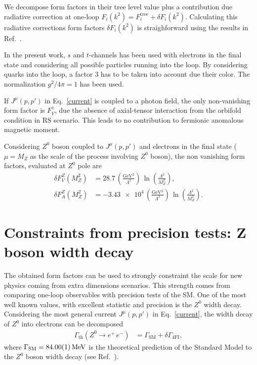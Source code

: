 \documentclass[twocolumn,showpacs,showkeys,prd,superscriptaddress]{revtex4-1}
\begin{document}
We decompose form factors in their tree level value plus a contribution due radiative correction at one-loop $F_i(k^2) = F_i^{\text{tree}} + \delta F_i(k^2)$. Calculating this radiative corrections form factors $\delta F_i(k^2)$ is straighforward using the results  in Ref.~\cite{GonzalezGarcia:1998ay}.

In the present work, $s$ and $t$-channels has been used with electrons in the final state and considering all possible particles running into the loop. By considering quarks into the loop, a factor $3$ has to be taken into account due their color. The normalization $g^2/4\pi = 1$ has been used.

If $J^\mu(p,p')$ in Eq.~\eqref{current} is coupled to a photon field, the only non-vanishing form factor is $F_V^\gamma$, due the absence of axial-tensor interaction from the orbifold condition in RS scenario. This leads to no contribution to fermionic anomalous magnetic moment.

Considering $Z^0$ boson coupled to $J^\mu(p,p')$ and electrons in the final state ($\mu = M_Z$ as the scale of the process involving $Z^0$ boson), the non vanishing form factors, evaluated at $Z^0$ pole are  
\begin{align}
  \delta F_V^Z(M_Z^2) &= \num{28.7} \, \left(\frac{\si{\GeV}^2}{\Lambda^2}\right)\,\ln\left(\frac{\Lambda^2}{M_Z^2}\right), \\
  \delta F_A^Z(M_Z^2) &= -\num{3.43e4} \, \left(\frac{\si{\GeV}^2}{\Lambda^2}\right)\,\ln\left(\frac{\Lambda^2}{M_Z^2}\right).
\end{align}


\section{\label{sec:constraints}Constraints from precision tests: Z boson width decay}

The obtained form factors can be used to strongly constraint the scale for new physics coming from extra dimensions scenarios. This strength comes from comparing one-loop observables with precision tests of the SM. One of the most well known values, with excellent statistic and precision is the $Z^0$ width decay. Considering the most general current $J^\mu(p,p')$ in Eq.~\eqref{current}, the width decay of $Z^0$ into electrons can be decomposed
\begin{align}
  \Gamma_{\text{th}}\left(Z^0\rightarrow e^+\,e^-\right) &= \Gamma_{\text{SM}} + \delta\Gamma_{\text{4FI}} ,
\end{align}
where $\Gamma_{\text{SM}} = \SI{84.00 \pm 0.01}{\MeV}$ is the theoretical prediction of the Standard Model to the $Z^0$ boson width decay (see Ref.~\cite{Beringer:1900zz}).
\end{document}
